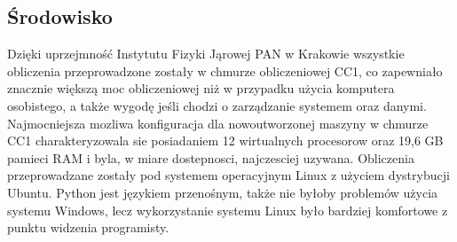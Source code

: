 \subsection{Środowisko}
Dzięki uprzejmność Instytutu Fizyki Jąrowej PAN w Krakowie wszystkie obliczenia przeprowadzone zostały w chmurze obliczeniowej CC1, co zapewniało znacznie większą moc obliczeniowej niż w przypadku użycia komputera osobistego, a także wygodę jeśli chodzi o zarządzanie systemem oraz danymi. Najmocniejsza mozliwa konfiguracja dla nowoutworzonej maszyny w chmurze CC1 charakteryzowala sie posiadaniem 12 wirtualnych procesorow oraz 19,6 GB pamieci RAM i byla, w miare dostepnosci, najczesciej uzywana. Obliczenia przeprowadzane zostały pod systemem operacyjnym Linux z użyciem dystrybucji Ubuntu. Python jest językiem przenośnym, także nie byłoby problemów użycia systemu Windows, lecz wykorzystanie systemu Linux było bardziej komfortowe z punktu widzenia programisty.

